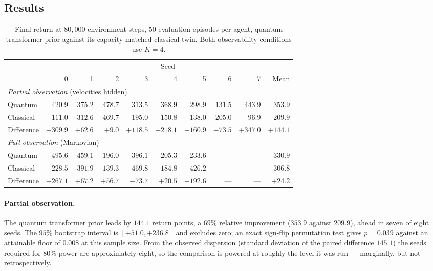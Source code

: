 \documentclass[11pt,onecolumn]{article}
\begin{document}
\subsection{Results}
\begin{table}[htb]\centering\small
\caption{Final return at $80{,}000$ environment steps, $50$ evaluation
episodes per agent, quantum transformer prior against its
capacity-matched classical twin. Both observability conditions use
$K = 4$.}
\label{tab:closedloop}
\begin{tabular}{lrrrrrrrrr}
\toprule
& \multicolumn{9}{c}{Seed} \\
\cmidrule(l){2-10}
& 0 & 1 & 2 & 3 & 4 & 5 & 6 & 7 & Mean \\
\midrule
\multicolumn{10}{l}{\emph{Partial observation} (velocities hidden)} \\
Quantum    & $420.9$ & $375.2$ & $478.7$ & $313.5$ & $368.9$ & $298.9$ & $131.5$ & $443.9$ & $\mathbf{353.9}$ \\
Classical  & $111.0$ & $312.6$ & $469.7$ & $195.0$ & $150.8$ & $138.0$ & $205.0$ & $96.9$  & $209.9$ \\
Difference & $+309.9$ & $+62.6$ & $+9.0$ & $+118.5$ & $+218.1$ & $+160.9$ & $-73.5$ & $+347.0$ & $\mathbf{+144.1}$ \\
\midrule
\multicolumn{10}{l}{\emph{Full observation} (Markovian)} \\
Quantum    & $495.6$ & $459.1$ & $196.0$ & $396.1$ & $205.3$ & $233.6$ & --- & --- & $330.9$ \\
Classical  & $228.5$ & $391.9$ & $139.3$ & $469.8$ & $184.8$ & $426.2$ & --- & --- & $306.8$ \\
Difference & $+267.1$ & $+67.2$ & $+56.7$ & $-73.7$ & $+20.5$ & $-192.6$ & --- & --- & $+24.2$ \\
\bottomrule
\end{tabular}
\end{table}

\paragraph{Partial observation.}
The quantum transformer prior leads by $144.1$ return points, a $69\%
$ relative improvement ($353.9$ against $209.9$), ahead in seven of
eight seeds. The $95\%$ bootstrap interval is $[+51.0, +236.8]$ and
excludes zero; an exact sign-flip permutation test gives
$p = 0.039$ against an attainable floor of $0.008$ at this sample size.
From the observed dispersion (standard deviation of the paired
difference $145.1$) the seeds required for $80\%$ power are
approximately eight, so the comparison is powered at roughly the
level it was run --- marginally, but not retrospectively.
\end{document}
